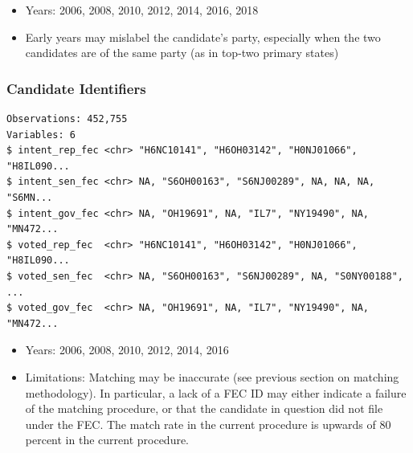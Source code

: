 \documentclass[10pt,article,oneside]{memoir}
\theoremstyle{definition}
\begin{document}
\begin{itemize}
\tightlist
\item
  Years: 2006, 2008, 2010, 2012, 2014, 2016, 2018
\item
  Early years may mislabel the candidate's party, especially when the
  two candidates are of the same party (as in top-two primary states)
\end{itemize}

\hypertarget{candidate-identifiers}{%
\subsubsection{Candidate Identifiers}\label{candidate-identifiers}}

\begin{verbatim}
Observations: 452,755
Variables: 6
$ intent_rep_fec <chr> "H6NC10141", "H6OH03142", "H0NJ01066", "H8IL090...
$ intent_sen_fec <chr> NA, "S6OH00163", "S6NJ00289", NA, NA, NA, "S6MN...
$ intent_gov_fec <chr> NA, "OH19691", NA, "IL7", "NY19490", NA, "MN472...
$ voted_rep_fec  <chr> "H6NC10141", "H6OH03142", "H0NJ01066", "H8IL090...
$ voted_sen_fec  <chr> NA, "S6OH00163", "S6NJ00289", NA, "S0NY00188", ...
$ voted_gov_fec  <chr> NA, "OH19691", NA, "IL7", "NY19490", NA, "MN472...
\end{verbatim}

\begin{itemize}
\tightlist
\item
  Years: 2006, 2008, 2010, 2012, 2014, 2016
\item
  Limitations: Matching may be inaccurate (see previous section on
  matching methodology). In particular, a lack of a FEC ID may either
  indicate a failure of the matching procedure, or that the candidate in
  question did not file under the FEC. The match rate in the current
  procedure is upwards of 80 percent in the current procedure.
\end{itemize}
\end{document}
